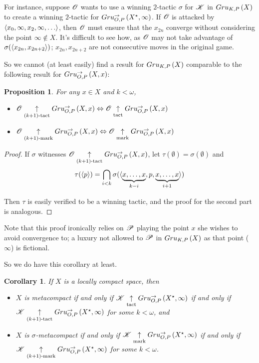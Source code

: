 \documentclass{amsart}
\newtheorem{proposition}[theorem]{Proposition}
\newtheorem{corollary}[theorem]{Corollary}
\theoremstyle{definition}
\begin{document}
For instance, suppose $\mathscr{O}$ wants to use a winning $2$-tactic $\sigma$
for $\mathscr{K}$ in
$Gru_{K,P}\left({X}\right)$ to create a winning $2$-tactic for
$Gru_{O,P}^{\to}\left({X^\star},{\infty}\right)$. If $\mathscr{O}$ is attacked by
$\<x_0,\infty,x_2,\infty,\dots\>$, then $\mathscr{O}$ must ensure that the $x_{2n}$
converge without considering the point $\infty\not\in X$.
It's difficult to see how, as $\mathscr{O}$ may not take advantage of
$\sigma(\langle x_{2n},x_{2n+2}\rangle)$;
$x_{2n},x_{2n+2}$ are not consecutive moves in the original game.

So we cannot (at least easily) find a result for $Gru_{K,P}\left({X}\right)$
comparable to the following result for $Gru_{O,P}^{\to}\left({X},{x}\right)$:

\begin{proposition} For any $x\in X$ and $k<\omega$,
  \begin{itemize}
    \item
      $
      \mathscr{O}\underset{(k+1)\text{-tact}}{\uparrow}Gru_{O,P}^{\to}\left({X},{x}\right)
        \Leftrightarrow
      \mathscr{O}\underset{\text{tact}}{\uparrow}Gru_{O,P}^{\to}\left({X},{x}\right)
      $
    \item
      $
      \mathscr{O}\underset{(k+1)\text{-mark}}{\uparrow}Gru_{O,P}^{\to}\left({X},{x}\right)
        \Leftrightarrow
      \mathscr{O}\underset{\text{mark}}{\uparrow}Gru_{O,P}^{\to}\left({X},{x}\right)
      $
  \end{itemize}
\end{proposition}

\begin{proof}
  If $\sigma$ witnesses $\mathscr{O}\underset{(k+1)\text{-tact}}{\uparrow}Gru_{O,P}^{\to}\left({X},{x}\right)$,
  let $\tau(\emptyset)=\sigma(\emptyset)$ and
    \[
      \tau(\langle p\rangle)
        =
      \bigcap_{i< k}
      \sigma(\langle\underbrace{x,\dots,x}_{k-i},p,\underbrace{x,\dots,x}_{i+1}\rangle)
    \]

  Then $\tau$ is easily verified to be a winning tactic, and
  the proof for the second part is analogous.
\end{proof}

Note that this proof ironically relies on $\mathscr{P}$ playing
the point $x$ she wishes to avoid convergence to; a luxury not allowed to
$\mathscr{P}$ in $Gru_{K,P}\left({X}\right)$ as that point ($\infty$) is fictional.

So we do have this corollary at least.

\begin{corollary}
  If $X$ is a locally compact space, then
  \begin{itemize}
    \item
    $X$ is metacompact if and only if
    $\mathscr{K}\underset{\text{tact}}{\uparrow}Gru_{O,P}^{\to}\left({X^\star},{\infty}\right)$ if and only if
    $\mathscr{K}\underset{(k+1)\text{-tact}}{\uparrow}Gru_{O,P}^{\to}\left({X^\star},{\infty}\right)$
    for some $k<\omega$, and
    \item
    $X$ is $\sigma$-metacompact if and only if
    $\mathscr{K}\underset{\text{mark}}{\uparrow}Gru_{O,P}^{\to}\left({X^\star},{\infty}\right)$ if and only if
    $\mathscr{K}\underset{(k+1)\text{-mark}}{\uparrow}Gru_{O,P}^{\to}\left({X^\star},{\infty}\right)$
    for some $k<\omega$.
  \end{itemize}
\end{corollary}
\end{document}
